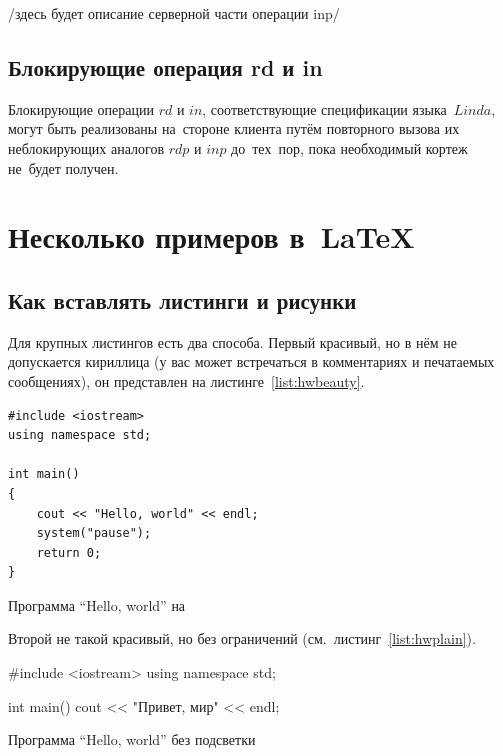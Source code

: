 /здесь будет описание серверной части операции inp/

\subsection{Блокирующие операция rd и in}\label{subsec5:4}
Блокирующие операции $rd$ и $in$, соответствующие спецификации языка~$Linda$, могут быть реализованы на~стороне клиента путём повторного вызова их неблокирующих аналогов $rdp$ и $inp$ до~тех~пор, пока необходимый кортеж не~будет получен.

\section{Несколько примеров в~\LaTeX{}}
\label{sec:examples}
\subsection{Как вставлять листинги и рисунки}
Для крупных листингов есть два способа. Первый красивый, но в нём не допускается
кириллица (у вас может встречаться в комментариях и
печатаемых сообщениях), он представлен на листинге~\ref{list:hwbeauty}.
\begin{ListingEnv}[H]%
\begin{lstlisting}
#include <iostream>
using namespace std;

int main()
{
    cout << "Hello, world" << endl;
    system("pause");
    return 0;
}
\end{lstlisting}
\caption{Программа “Hello, world” на \protect\cpp}
\label{list:hwbeauty}
\end{ListingEnv}

Второй не такой красивый, но без ограничений (см.~листинг~\ref{list:hwplain}).
\begin{ListingEnv}[H]
\begin{Verb}

#include <iostream>
using namespace std;

int main()
{
    cout << "Привет, мир" << endl;
}
\end{Verb}
\caption{Программа “Hello, world” без подсветки}
\label{list:hwplain}
\end{ListingEnv}

